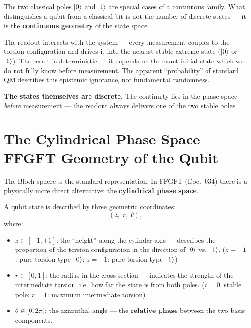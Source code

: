 \begin{keypoint}
The two classical poles $\left|0\right\rangle$ and $\left|1\right\rangle$
are special cases of a continuous family.
What distinguishes a qubit from a classical bit
is not the number of discrete states ---
it is the \textbf{continuous geometry} of the state space.

The readout interacts with the system --- every measurement
couples to the torsion configuration and drives it
into the nearest stable extreme state ($\left|0\right\rangle$ or $\left|1\right\rangle$).
The result is deterministic --- it depends on the exact
initial state which we do not fully know before measurement.
The apparent ``probability'' of standard QM describes
this epistemic ignorance, not fundamental randomness.

\textbf{The states themselves are discrete.} The continuity
lies in the phase space \emph{before} measurement ---
the readout always delivers one of the two stable poles.
\end{keypoint}

\section{The Cylindrical Phase Space --- FFGFT Geometry of the Qubit}
\label{sec:cylinder}

The Bloch sphere is the standard representation.
In FFGFT (Doc.~034) there is a
physically more direct alternative:
the \textbf{cylindrical phase space}.

A qubit state is described by
three geometric coordinates:
\begin{equation}
  (z,\; r,\; \theta),
\end{equation}
where:
\begin{itemize}
  \item $z \in [-1, +1]$: the ``height'' along the
    cylinder axis --- describes the proportion
    of the torsion configuration in the direction of $\left|0\right\rangle$ vs.\ $\left|1\right\rangle$.
    ($z = +1$: pure torsion type~$\left|0\right\rangle$; $z = -1$: pure torsion type~$\left|1\right\rangle$)
  \item $r \in [0, 1]$: the radius in the cross-section ---
    indicates the strength of the intermediate torsion,
    i.e.\ how far the state is from both poles.
    ($r = 0$: stable pole; $r = 1$: maximum intermediate torsion)
  \item $\theta \in [0, 2\pi)$: the azimuthal angle ---
    the \textbf{relative phase} between the two basis components.
\end{itemize}

